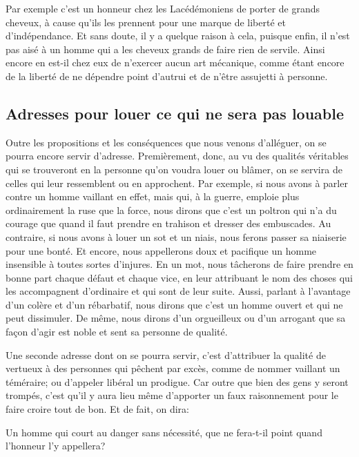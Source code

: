 Par exemple c'est un honneur chez les Lacédémoniens de porter de grands cheveux, à cause qu'ils les prennent
pour une marque de liberté et d'indépendance. Et sans doute, il y a quelque raison à cela, puisque enfin, il
n'est pas aisé à un homme qui a les cheveux grands de faire rien de servile. Ainsi encore en est-il chez eux
de n'exercer aucun art mécanique, comme étant encore de la liberté de ne dépendre point d'autrui et de n'être
assujetti à personne.

\subsection{Adresses pour louer ce qui ne sera pas louable}

Outre les propositions et les conséquences que nous venons d'alléguer, on se pourra encore servir d'adresse.
Premièrement, donc, au vu des qualités véritables qui se trouveront en la personne qu'on voudra louer ou blâmer,
on se servira de celles qui leur ressemblent ou en approchent. Par exemple, si nous avons à parler contre un homme
vaillant en effet, mais qui, à la guerre, emploie plus ordinairement la ruse que la force, nous dirons que c'est
un poltron qui n'a du courage que quand il faut prendre en trahison et dresser des embuscades. Au contraire, si
nous avons à louer un sot et un niais, nous ferons passer sa niaiserie pour une bonté. Et encore, nous appellerons
doux et pacifique un homme insensible à toutes sortes d'injures. En un mot, nous tâcherons de faire prendre en bonne
part chaque défaut et chaque vice, en leur attribuant le nom des choses qui les accompagnent d'ordinaire et qui sont
de leur suite. Aussi, parlant à l'avantage d'un colère et d'un rébarbatif, nous dirons que c'est un homme ouvert et
qui ne peut dissimuler. De même, nous dirons d'un orgueilleux ou d'un arrogant que sa façon d'agir est noble et sent
sa personne de qualité.

\bigbreak

Une seconde adresse dont on se pourra servir, c'est d'attribuer la qualité de vertueux à des personnes qui pêchent
par excès, comme de nommer vaillant un téméraire; ou d'appeler libéral un prodigue. Car outre que bien des gens y
seront trompés, c'est qu'il y aura lieu même d'apporter un faux raisonnement pour le faire croire tout de bon. Et de
fait, on dira:

\begin{emphpar}
	Un homme qui court au danger sans nécessité, que ne fera-t-il point quand l'honneur l'y appellera?
\end{emphpar}

